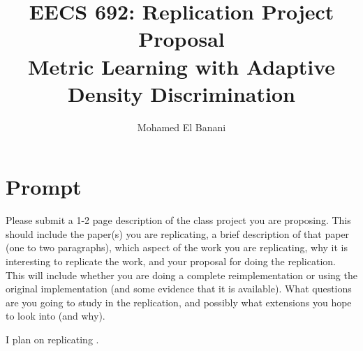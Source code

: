 \documentclass{article}
\title{EECS 692: Replication Project Proposal\\
Metric Learning with Adaptive Density Discrimination}
\author{Mohamed El Banani}
\begin{document}
\maketitle

\section{Prompt}
Please submit a 1-2 page description of the class project you are proposing.
This should include the paper(s) you are replicating, a brief description of that paper (one to two paragraphs),
which aspect of the work you are replicating, why it is interesting to replicate the work,
and your proposal for doing the replication.
This will include whether you are doing a complete reimplementation or using the original implementation (and some evidence that it is available).
What questions are you going to study in the replication, and possibly what extensions you hope to look into (and why).


I plan on replicating \cite{rippel2016metric}.




\end{document}
